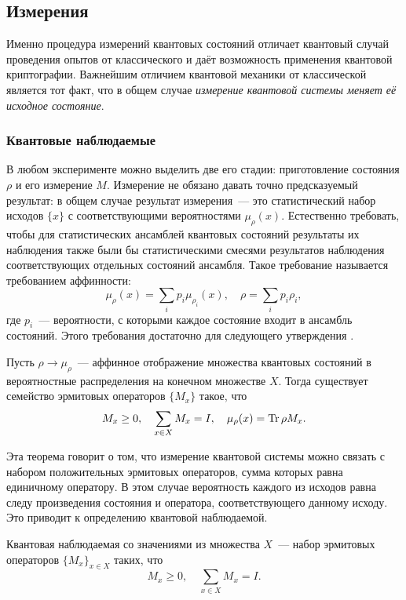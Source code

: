 \subsection{Измерения}
Именно процедура измерений квантовых состояний отличает квантовый случай проведения опытов от классического и даёт возможность применения квантовой криптографии. Важнейшим отличием квантовой механики от классической является тот факт, что в общем случае \textit{измерение квантовой системы меняет её исходное состояние}.

\subsubsection{Квантовые наблюдаемые}
В любом эксперименте можно выделить две его стадии: приготовление состояния $\rho$ и его измерение $M$. Измерение не обязано давать точно предсказуемый результат: в общем случае результат измерения~--- это статистический набор исходов $\{x\}$ с соответствующими вероятностями $\mu_\rho(x)$. Естественно требовать, чтобы для статистических ансамблей квантовых состояний результаты их наблюдения также были бы статистическими смесями результатов наблюдения соответствующих отдельных состояний ансамбля. Такое требование называется требованием аффинности:
\begin{equation} \mu_\rho(x) = \sum_i p_i \mu_{\rho_i}(x),\quad \rho = \sum_i p_i \rho_i, \end{equation}
где $p_i$~--- вероятности, с которыми каждое состояние входит в ансамбль состояний.
Этого требования достаточно для следующего утверждения \cite{holevo}.
\begin{theorem}
  Пусть $\rho \rightarrow \mu_\rho$~--- аффинное отображение множества квантовых состояний в вероятностные распределения на конечном множестве $X$. Тогда существует семейство эрмитовых операторов $\{M_x\}$ такое, что
  \begin{equation} M_x \ge 0,\quad \sum_{x \in X} M_x = I,\quad \mu_\rho(x) = \operatorname{Tr} \rho M_x. \end{equation}
\end{theorem}

Эта теорема говорит о том, что измерение квантовой системы можно связать с набором положительных эрмитовых операторов, сумма которых равна единичному оператору. В этом случае вероятность каждого из исходов равна следу произведения состояния и оператора, соответствующего данному исходу. Это приводит к определению квантовой наблюдаемой.
\begin{definition}
  Квантовая наблюдаемая со значениями из множества $X$~--- набор эрмитовых операторов $\{M_x\}_{x \in X}$ таких, что
  \begin{equation} M_x \ge 0,\quad \sum_{x \in X} M_x = I. \end{equation}
\end{definition}

